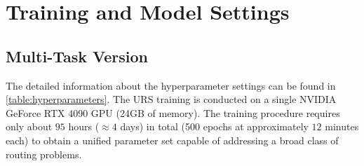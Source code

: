 \documentclass{article}
\theoremstyle{plain}
\theoremstyle{definition}
\theoremstyle{remark}
\begin{document}
\section{Training and Model Settings}
\label{append:model_setting}

\subsection{Multi-Task Version}
\label{append:URS_MTL}
\begin{table}
\vspace{-18pt}
\begin{center}
\caption{The hyperparameter settings of URS.}
\label{table:hyperparameters}
\end{center}
\end{table}
The detailed information about the hyperparameter settings can be found in \cref{table:hyperparameters}. The URS training is conducted on a single NVIDIA GeForce RTX 4090 GPU (24GB of memory). The training procedure requires only about $95$ hours ($\approx 4$ days) in total (500 epochs at approximately $ 12$ minutes each) to obtain a unified parameter set capable of addressing a broad class of routing problems. 
\end{document}
